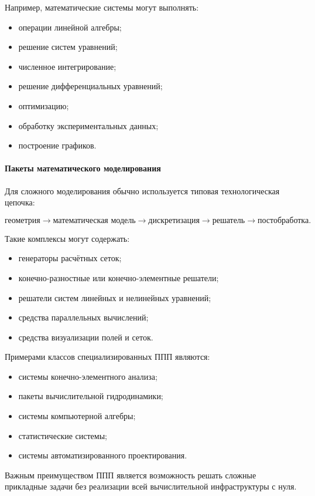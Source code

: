 Например, математические системы могут выполнять:
\begin{itemize}
	\item операции линейной алгебры;
	\item решение систем уравнений;
	\item численное интегрирование;
	\item решение дифференциальных уравнений;
	\item оптимизацию;
	\item обработку экспериментальных данных;
	\item построение графиков.
\end{itemize}

\paragraph{Пакеты математического моделирования}

Для сложного моделирования обычно используется типовая технологическая цепочка:

\[
\text{геометрия}
\rightarrow
\text{математическая модель}
\rightarrow
\text{дискретизация}
\rightarrow
\text{решатель}
\rightarrow
\text{постобработка}.
\]

Такие комплексы могут содержать:
\begin{itemize}
	\item генераторы расчётных сеток;
	\item конечно-разностные или конечно-элементные решатели;
	\item решатели систем линейных и нелинейных уравнений;
	\item средства параллельных вычислений;
	\item средства визуализации полей и сеток.
\end{itemize}

Примерами классов специализированных ППП являются:
\begin{itemize}
	\item системы конечно-элементного анализа;
	\item пакеты вычислительной гидродинамики;
	\item системы компьютерной алгебры;
	\item статистические системы;
	\item системы автоматизированного проектирования.
\end{itemize}

Важным преимуществом ППП является возможность решать сложные прикладные задачи без реализации всей вычислительной инфраструктуры с нуля.

